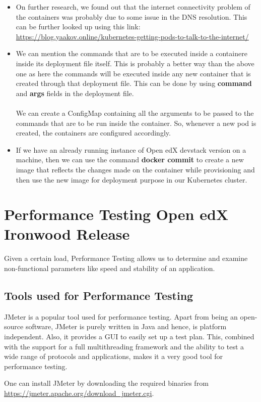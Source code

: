 \documentclass[12pt]{report}
\begin{document}
\begin{itemize}
	\item On further research, we found out that the internet connectivity problem of the containers was probably due to some issue in the DNS resolution. This can be further looked up using this link: \href{https://blog.yaakov.online/kubernetes-getting-pods-to-talk-to-the-internet/}{https://blog.yaakov.online/kubernetes-getting-pods-to-talk-to-the-internet/}\cite{DNS}
	\item We can mention the commands that are to be executed inside a containere inside its deployment file itself. This is probably a better way than the above one as here the commands will be executed inside any new container that is created through that deployment file. This can be done by using \textbf{command} and \textbf{args} fields in the deployment file.\\\\
	We can create a ConfigMap containing all the arguments to be passed to the commands that are to be run inside the container. So, whenever a new pod is created, the containers are configured accordingly.\cite{Configmap}
	\item If we have an already running instance of Open edX devstack version on a machine, then we can use the command \textbf{docker commit} to create a new image that reflects the changes made on the container while provisioning and then use the new image for deployment purpose in our Kubernetes cluster.
\end{itemize}
\pagebreak
\chapter{Performance Testing Open edX Ironwood Release}
Given a certain load, Performance Testing allows us to determine and examine non-functional parameters like speed and stability of an application.
\par
\section{Tools used for Performance Testing}
JMeter is a popular tool used for performance testing. Apart from being an open-source software, JMeter is purely written in Java and hence, is platform independent. Also, it provides a GUI to easily set up a test plan. This, combined with the support for a full multithreading framework and the ability to test a wide range of protocols and applications, makes it a very good tool for performance testing.
\par
One can install JMeter by downloading the required binaries from
\\
\url{https://jmeter.apache.org/download_jmeter.cgi}.
\par
\end{document}
